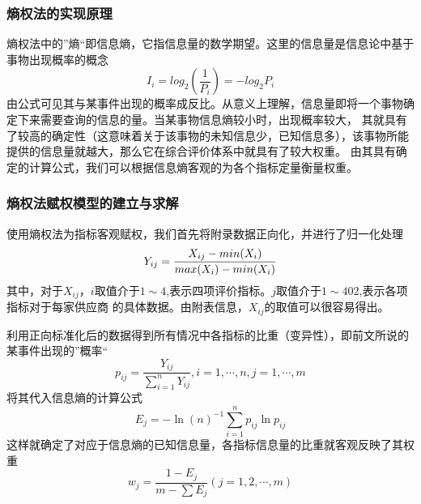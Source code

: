 \documentclass{cumcmthesis}
\begin{document}
\subsubsection*{熵权法的实现原理}
熵权法中的”熵“即信息熵，它指信息量的数学期望。这里的信息量是信息论中基于事物出现概率的概念
\begin{equation}
    I_i = log_2(\frac{1}{P_i})=-log_2P_i\nonumber
    \label{信息量}
\end{equation}
由公式可见其与某事件出现的概率成反比。从意义上理解，信息量即将一个事物确定下来需要查询的信息的量。当某事物信息熵较小时，出现概率较大，
其就具有了较高的确定性（这意味着关于该事物的未知信息少，已知信息多），该事物所能提供的信息量就越大，那么它在综合评价体系中就具有了较大权重。
由其具有确定的计算公式，我们可以根据信息熵客观的为各个指标定量衡量权重。
\subsubsection*{熵权法赋权模型的建立与求解}
使用熵权法为指标客观赋权，我们首先将附录数据正向化，并进行了归一化处理
\begin{equation}
    Y_{ij}=\frac{X_{ij}-min(X_i)}{max(X_i)-min(X_i)}\large\nonumber
    \label{归一化}
\end{equation}
其中，对于$X_{ij}$，$i$取值介于$1\sim4$,表示四项评价指标。$j$取值介于$1\sim402$,表示各项指标对于每家供应商
的具体数据。由附表信息，$X_{ij}$的取值可以很容易得出。\par
利用正向标准化后的数据得到所有情况中各指标的比重（变异性），即前文所说的某事件出现的”概率“
\begin{equation}
    p_{ij}=\frac{Y_{ij}}{\sum_{i=1}^{n}{Y_{ij}}},i=1,\cdots,n,j=1,\cdots,m\nonumber
    \label{指标比重}
\end{equation}
将其代入信息熵的计算公式
\begin{equation}
    E_j = -\ln(n)^{-1}\sum_{i=1}^{n}{p_{ij}}\ln{p_{ij}}\nonumber
\end{equation}
这样就确定了对应于信息熵的已知信息量，各指标信息量的比重就客观反映了其权重
\begin{equation}
    w_j=\frac{1-E_j}{m-\sum E_j}(j=1,2,\cdots,m)
\end{equation}
\end{document}
